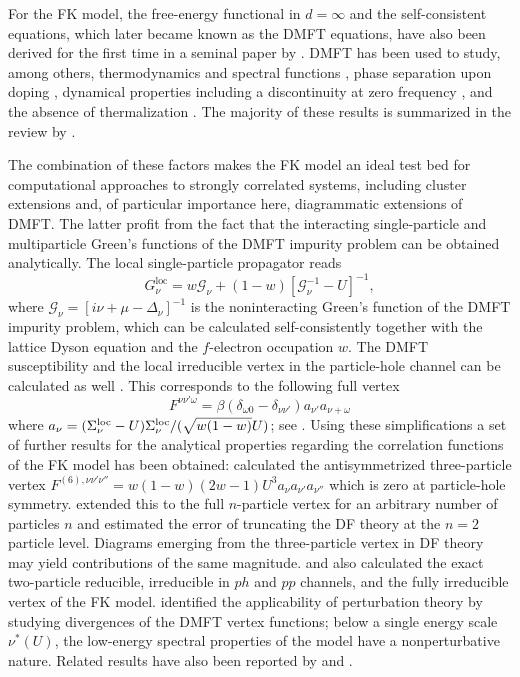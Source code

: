 \documentclass[rmp,aps,reprint,amsmath,amssymb,superscriptaddress,showpacs,nofootinbib]{revtex4-1}
\begin{document}
For the FK model, the free-energy functional in $d=\infty$  and the self-consistent  equations, which  later became known as the DMFT equations, have also been derived for the first time in a seminal paper by  . DMFT has been used to study, among others, thermodynamics and  spectral functions \cite{Brandt1989,Brandt1990,Brandt1991},  phase separation  upon doping \cite{Freericks2000c},  dynamical properties including a discontinuity at zero frequency \cite{Freericks2000a}, and the absence of thermalization \cite{Eckstein2008,Eckstein2009}. The majority of these results is summarized in the review by .

The combination of these factors makes the FK model an ideal test bed for computational approaches to strongly correlated systems, including cluster extensions \cite{Hettler1998,Hettler2000,Maier2005} and, of particular importance here, diagrammatic extensions of DMFT. The latter profit from the fact that the interacting single-particle and multiparticle Green's functions of the DMFT impurity problem can be obtained analytically. The local single-particle propagator reads 
\begin{equation}
\label{Eq:DMFTFKM}
  G^{\mathrm{loc}}_\nu = w \mathcal{G}_\nu + (1 - w) \left[\mathcal{G}^{-1}_\nu - U\right]^{-1},
\end{equation}
where $\mathcal{G}_\nu = \left[i\nu + \mu - \Delta_\nu\right]^{-1}$  is the noninteracting Green's function of the DMFT impurity problem, which can be calculated self-consistently together with the lattice Dyson equation and the $f$-electron occupation $w$. The DMFT susceptibility and the local irreducible vertex in the particle-hole channel can be calculated as well \cite{Freericks2003}. This corresponds to  the following full vertex 
\begin{equation}
  F^{\nu\nu'\omega} =  \beta\left( \delta_{\omega 0}- \delta_{\nu\nu'} \right) a_{\nu'}a_{\nu+\omega}
\end{equation}
where $a_\nu= (\Sigma_\nu^{\rm loc}-U) \Sigma_\nu^{\rm loc}/(\sqrt{w(1-w)}U)$; see  . Using these simplifications a set of further results for the analytical properties regarding the correlation functions of the FK model has been obtained:  calculated the  antisymmetrized three-particle vertex $F^{(6),\nu \nu' \nu''} = w (1-w) (2w - 1) U^3 a_\nu a_{\nu'} a_{\nu''}$ which is zero at  particle-hole symmetry.  extended this to the full $n$-particle vertex for an arbitrary number of particles $n$ and  estimated the error of truncating the DF theory at the $n\!=\!2$ particle level. Diagrams emerging from the three-particle vertex in DF theory may yield contributions of the same magnitude.  and  also calculated the exact two-particle reducible, irreducible in $ph$ and $pp$ channels, and the fully irreducible vertex of the FK model.  identified the applicability of perturbation theory by studying divergences of the DMFT vertex functions; below a single energy scale $\nu^*(U)$, the low-energy spectral properties of the model have a nonperturbative nature. Related results have also been reported by  and .
 
\end{document}
